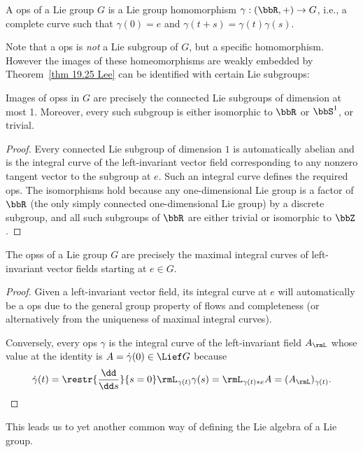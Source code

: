 \begin{defn}
    A \gls{ops} of a Lie group $G$ is a Lie group homomorphism $\gamma:(\bbR,+)\to G$, i.e., a complete curve such that $\gamma(0)=e$ and $\gamma(t+s)=\gamma(t)\gamma(s)$.
\end{defn}

Note that a \gls{ops} is \emph{not} a Lie subgroup of $G$, but a specific homomorphism. However the images of these homeomorphisms are weakly embedded by Theorem~\ref{thm 19.25 Lee} can be identified with certain Lie subgroups:

\begin{prop}
    Images of \glspl{ops} in $G$ are precisely the connected Lie subgroups of dimension at most 1. Moreover, every such subgroup is either isomorphic to $\bbR$ or $\bbS^1$, or trivial.
\end{prop}
\begin{proof}
    Every connected Lie subgroup of dimension $1$ is automatically abelian and is the integral curve of the left-invariant vector field corresponding to any nonzero tangent vector to the subgroup at $e$. Such an integral curve defines the required \gls{ops}. The isomorphisms hold because any one-dimensional Lie group is a factor of $\bbR$ (the only simply connected one-dimensional Lie group) by a discrete subgroup, and all such subgroups of $\bbR$ are either trivial or isomorphic to $\bbZ$.
\end{proof}


\begin{thm}
    The \glspl{ops} of a Lie group $G$ are precisely the maximal integral curves of left-invariant vector fields starting at $e\in G$.
\end{thm}
\begin{proof}
    Given a left-invariant vector field, its integral curve at $e$ will automatically be a \gls{ops} due to the general group property of flows and completeness (or alternatively from the uniqueness of maximal integral curves).

    Conversely, every \gls{ops} $\gamma$ is the integral curve of the left-invariant field $A_\rmL$ whose value at the identity is $A=\dot\gamma(0)\in\Lief G$ because 
    \[\dot\gamma(t)=\restr{\frac{\dd}{\dd s}}{s=0}\rmL_{\gamma(t)}\gamma(s)=\rmL_{\gamma(t)\ast e}A=(A_\rmL)_{\gamma(t)}.\]
\end{proof}

This leads us to yet another common way of defining the Lie algebra of a Lie group.

